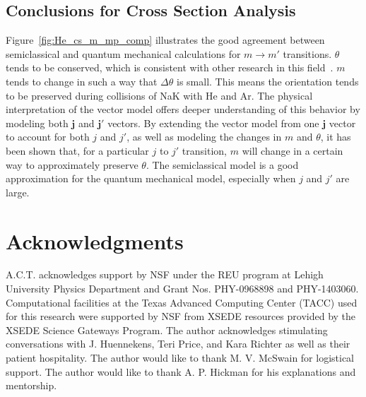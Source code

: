 \documentclass[letterpaper,11pt]{article}
\newcommand{\vectorize}[1]{\boldsymbol{#1}}
\begin{document}
\subsection{Conclusions for Cross Section Analysis}
Figure~\ref{fig:He_cs_m_mp_comp} illustrates the good agreement between semiclassical and
quantum mechanical calculations for $m\rightarrow m'$ transitions.  $\theta$ tends to be
conserved, which is consistent with other research in this field~\cite{Ale83}.
$m$ tends to change in such a way that $\Delta\theta$ is small.  This means the
orientation tends to be preserved during collisions of NaK with He and Ar.  The
physical interpretation of the vector model offers deeper understanding of this
behavior by modeling both $\vectorize{j}$ and $\vectorize{j'}$ vectors.  By
extending the vector model from one $\vectorize{j}$ vector to account for both
$j$ and $j'$, as well as modeling the changes in $m$ and $\theta$, it has been
shown that, for a particular $j$ to $j'$ transition, $m$ will change in a
certain way to approximately preserve $\theta$.  The semiclassical model is a
good approximation for the quantum mechanical model, especially when $j$ and
$j'$ are large.

\section{Acknowledgments}
A.C.T. acknowledges support by NSF under the REU program at Lehigh University
Physics Department and Grant Nos. PHY-0968898 and PHY-1403060.  Computational
facilities at the Texas Advanced Computing Center (TACC) used for this research
were supported by NSF from XSEDE resources provided by the XSEDE Science 
Gateways Program.  The author acknowledges stimulating conversations with J.
Huennekens, Teri Price, and Kara Richter as well as their patient hospitality.
The author would like to thank M. V. McSwain for logistical support.  The author
would like to thank A. P. Hickman for his explanations and mentorship.


\end{document}
